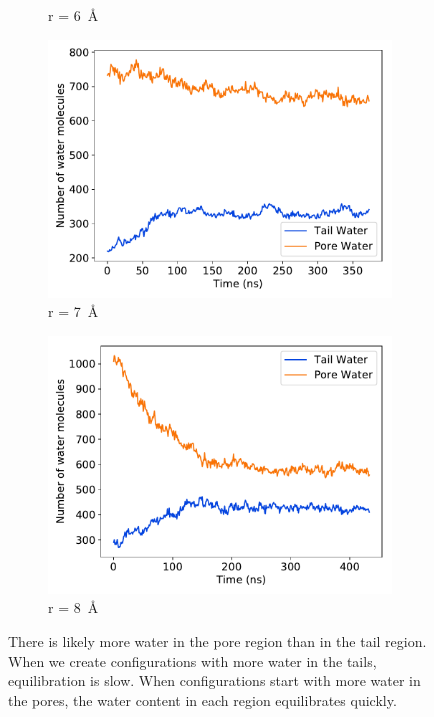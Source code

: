 \documentclass{article}
\begin{document}
\begin{figure}[!htb]
\begin{subfigure}{0.45\textwidth}
  \caption{r = 6~\AA}\label{fig:r6_gap}
  \end{subfigure}
  \begin{subfigure}{0.45\textwidth}
  \includegraphics[width=\linewidth]{r7_gap.pdf}
  \caption{r = 7~\AA}\label{fig:r7_gap}
  \end{subfigure}
  \begin{subfigure}{0.45\textwidth}
  \includegraphics[width=\linewidth]{r8_gap.pdf}
  \caption{r = 8~\AA}\label{fig:r8_gap}
  \end{subfigure}
  \caption{There is likely more water in the pore region than in the tail region.
  When we create configurations with more water in the tails, equilibration is 
  slow. When configurations start with more water in the pores, the water content
  in each region equilibrates quickly.}\label{fig:gap_prefilled_equil}
  \end{figure}
\end{document}

